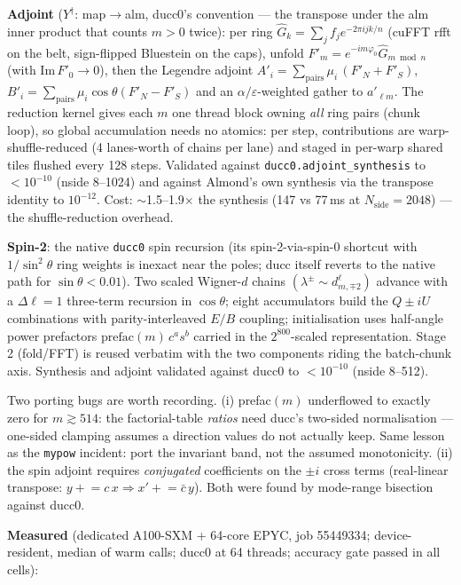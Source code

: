 \documentclass[11pt]{article}
\newcommand{\eps}{\varepsilon}
\newcommand{\cth}{\cos\theta}
\begin{document}
\textbf{Adjoint} ($Y^\dagger$: map$\to$alm, ducc0's convention --- the
transpose under the alm inner product that counts $m>0$ twice): per ring
$\hat G_k = \sum_j f_j e^{-2\pi i jk/n}$ (cuFFT rfft on the belt,
sign-flipped Bluestein on the caps), unfold
$F'_m = e^{-im\varphi_0}\hat G_{m \bmod n}$ (with $\mathrm{Im}\,F'_0 \to
0$), then the Legendre adjoint
$A'_i = \sum_\mathrm{pairs} \mu_i\,(F'_N{+}F'_S)$,
$B'_i = \sum_\mathrm{pairs} \mu_i \cth (F'_N{-}F'_S)$ and an
$\alpha/\eps$-weighted gather to $a'_{\ell m}$.  The reduction kernel gives
each $m$ one thread block owning \emph{all} ring pairs (chunk loop), so
global accumulation needs no atomics: per step, contributions are
warp-shuffle-reduced (4 lanes-worth of chains per lane) and staged in
per-warp shared tiles flushed every 128 steps.  Validated against
\texttt{ducc0.adjoint\_synthesis} to $<10^{-10}$ (nside 8--1024) and
against Almond's own synthesis via the transpose identity to $10^{-12}$.
Cost: $\sim$1.5--1.9$\times$ the synthesis (147 vs 77\,ms at
$N_\mathrm{side}{=}2048$) --- the shuffle-reduction overhead.

\textbf{Spin-2}: the native \texttt{ducc0} spin recursion (its
spin-2-via-spin-0 shortcut with $1/\sin^2\theta$ ring weights is inexact
near the poles; ducc itself reverts to the native path for
$\sin\theta<0.01$).  Two scaled Wigner-$d$ chains
$(\lambda^\pm \sim d^\ell_{m,\mp 2})$ advance with a $\Delta\ell=1$
three-term recursion in $\cth$; eight accumulators build the $Q\pm iU$
combinations with parity-interleaved $E/B$ coupling; initialisation uses
half-angle power prefactors $\mathrm{prefac}(m)\,c^{a}s^{b}$ carried in the
$2^{800}$-scaled representation.  Stage 2 (fold/FFT) is reused verbatim
with the two components riding the batch-chunk axis.  Synthesis and
adjoint validated against ducc0 to $<10^{-10}$ (nside 8--512).

Two porting bugs are worth recording.  (i) prefac$(m)$ underflowed to
exactly zero for $m \gtrsim 514$: the factorial-table \emph{ratios} need
ducc's two-sided normalisation --- one-sided clamping assumes a direction
values do not actually keep.  Same lesson as the \texttt{mypow} incident:
port the invariant band, not the assumed monotonicity.  (ii) the spin
adjoint requires \emph{conjugated} coefficients on the $\pm i$ cross terms
(real-linear transpose: $y \mathrel{+}= c\,x \Rightarrow x' \mathrel{+}=
\bar c\,y$).  Both were found by mode-range bisection against ducc0.

\textbf{Measured} (dedicated A100-SXM + 64-core EPYC, job 55449334;
device-resident, median of warm calls; ducc0 at 64 threads; accuracy gate
passed in all cells):
\end{document}
